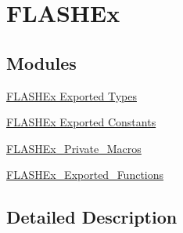 \hypertarget{group___f_l_a_s_h_ex}{}\section{F\+L\+A\+S\+H\+Ex}
\label{group___f_l_a_s_h_ex}
\subsection*{Modules}
\begin{DoxyCompactItemize}
\item 
\hyperlink{group___f_l_a_s_h_ex___exported___types}{F\+L\+A\+S\+H\+Ex Exported Types}
\item 
\hyperlink{group___f_l_a_s_h_ex___exported___constants}{F\+L\+A\+S\+H\+Ex Exported Constants}
\item 
\hyperlink{group___f_l_a_s_h_ex___private___macros}{F\+L\+A\+S\+H\+Ex\+\_\+\+Private\+\_\+\+Macros}
\item 
\hyperlink{group___f_l_a_s_h_ex___exported___functions}{F\+L\+A\+S\+H\+Ex\+\_\+\+Exported\+\_\+\+Functions}
\end{DoxyCompactItemize}


\subsection{Detailed Description}
